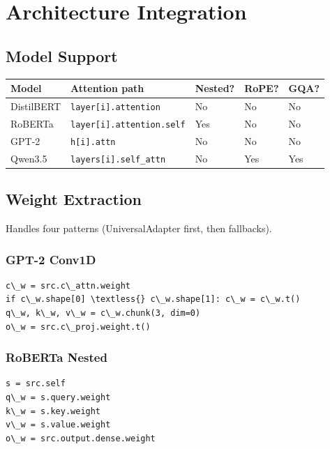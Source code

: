 \section{Architecture Integration}

\subsection{Model Support}

\begin{table}[H]
\centering
\small
\begin{tabular}{lllll}
\toprule
\textbf{Model} & \textbf{Attention path} & \textbf{Nested?} & \textbf{RoPE?} & \textbf{GQA?} \\
\midrule
DistilBERT & \texttt{layer[i].attention} & No & No & No \\
RoBERTa & \texttt{layer[i].attention.self} & Yes & No & No \\
GPT-2 & \texttt{h[i].attn} & No & No & No \\
Qwen3.5 & \texttt{layers[i].self\_attn} & No & Yes & Yes \\
\bottomrule
\end{tabular}
\end{table}

\subsection{Weight Extraction}

Handles four patterns (UniversalAdapter first, then fallbacks).

\subsubsection{GPT-2 Conv1D}

\begin{lstlisting}
c\_w = src.c\_attn.weight
if c\_w.shape[0] \textless{} c\_w.shape[1]: c\_w = c\_w.t()
q\_w, k\_w, v\_w = c\_w.chunk(3, dim=0)
o\_w = src.c\_proj.weight.t()
\end{lstlisting}

\subsubsection{RoBERTa Nested}

\begin{lstlisting}
s = src.self
q\_w = s.query.weight
k\_w = s.key.weight
v\_w = s.value.weight
o\_w = src.output.dense.weight
\end{lstlisting}

